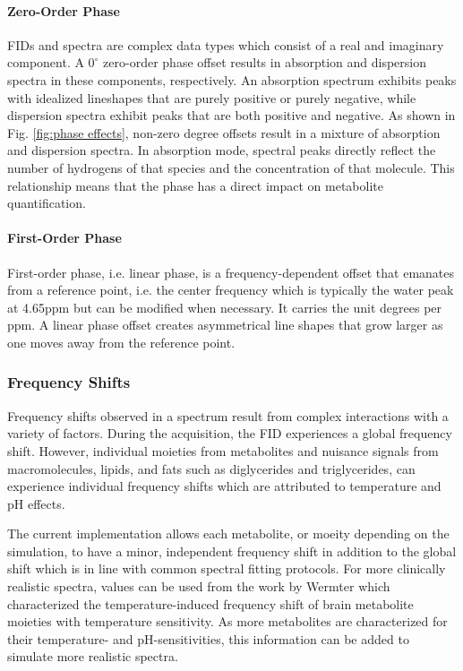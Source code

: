 \paragraph{Zero-Order Phase}
FIDs and spectra are complex data types which consist of a real and imaginary component. A $0^{\circ}$ zero-order phase offset results in absorption and dispersion spectra in these components, respectively. An absorption spectrum exhibits peaks with idealized lineshapes that are purely positive or purely negative, while dispersion spectra exhibit peaks that are both positive and negative. As shown in Fig. \ref{fig:phase effects}, non-zero degree offsets result in a mixture of absorption and dispersion spectra. In absorption mode, spectral peaks directly reflect the number of hydrogens of that species and the concentration of that molecule. This relationship means that the phase has a direct impact on metabolite quantification. 
 
\paragraph{First-Order Phase}
First-order phase, i.e. linear phase, is a frequency-dependent offset that emanates from a reference point, i.e. the center frequency which is typically the water peak at 4.65ppm but can be modified when necessary. It carries the unit degrees per ppm. A linear phase offset creates asymmetrical line shapes that grow larger as one moves away from the reference point.


 
\subsubsection{Frequency Shifts}
Frequency shifts observed in a spectrum result from complex interactions with a variety of factors. During the acquisition, the FID experiences a global frequency shift. However, individual moieties from metabolites and nuisance signals from macromolecules, lipids, and fats such as diglycerides and triglycerides, can experience individual frequency shifts which are attributed to temperature and pH effects.

The current implementation allows each metabolite, or moeity depending on the simulation, to have a minor, independent frequency shift in addition to the global shift which is in line with common spectral fitting protocols. For more clinically realistic spectra, values can be used from the work by Wermter \etal\cite{Wermter2017} which characterized the temperature-induced frequency shift of brain metabolite moieties with temperature sensitivity. As more metabolites are characterized for their temperature- and pH-sensitivities, this information can be added to simulate more realistic spectra.
 
